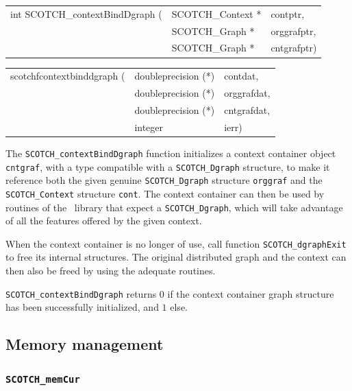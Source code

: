 \begin{itemize}
\progsyn

{\tt\begin{tabular}{l@{}ll}
int SCOTCH\_contextBindDgraph ( & SCOTCH\_Context * & contptr,    \\
                                & SCOTCH\_Graph *   & orggrafptr, \\
                                & SCOTCH\_Graph *   & cntgrafptr)
\end{tabular}}

{\tt\begin{tabular}{l@{}ll}
scotchfcontextbinddgraph ( & doubleprecision (*) & contdat,    \\
                           & doubleprecision (*) & orggrafdat, \\
                           & doubleprecision (*) & cntgrafdat, \\
                           & integer             & ierr)
\end{tabular}}

\progdes

The \texttt{SCOTCH\_contextBindDgraph} function initializes a context
container object \texttt{cnt\lbt graf}, with a type compatible with a
\texttt{SCOTCH\_\lbt Dgraph} structure, to make it reference both the
given genuine \texttt{SCOTCH\_\lbt Dgraph} structure
\texttt{org\lbt graf} and the \texttt{SCOTCH\_\lbt Context} structure
\texttt{cont}. The context container can then be used by routines of
the \libptscotch\ library that expect a \texttt{SCOTCH\_\lbt Dgraph},
which will take advantage of all the features offered by the given
context.

When the context container is no longer of use, call function
\texttt{SCOTCH\_\lbt dgraph\lbt Exit} to free its internal
structures. The original distributed graph and the context can then
also be freed by using the adequate routines.

\progret

\texttt{SCOTCH\_contextBindDgraph} returns $0$ if the context container
graph structure has been successfully initialized, and $1$ else.
\end{itemize}

\subsection{Memory management}
\label{sec-lib-mem}

\subsubsection{{\tt SCOTCH\_memCur}}

